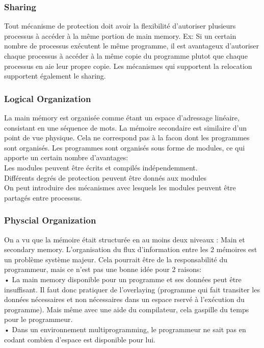 \subsubsection{Sharing}
Tout mécanisme de protection doit avoir la flexibilité d'autoriser plusieurs processus à accéder à la même portion de main memory.
Ex: Si un certain nombre de processus exécutent le même programme, il est avantageux d'autoriser chaque processus à accéder à la même copie du programme plutot que chaque processus en aie leur propre copie.
Les mécanismes qui supportent la relocation supportent également le sharing.
\subsubsection{Logical Organization}
La main mémory est organisée comme étant un espace d'adressage linéaire, consistant en une séquence de mots.
La mémoire secondaire est similaire d'un point de vue physique.
Cela ne correspond pas à la facon dont les programmes sont organisés.
Les programmes sont organisés sous forme de modules, ce qui apporte un certain nombre d'avantages: \\
Les modules peuvent être écrits et compilés indépendemment.
 \\
Différents degrés de protection peuvent être donnés aux modules \\
On peut introduire des mécanismes avec lesquels les modules peuvent être partagés entre processus.
\subsubsection{Physcial Organization}
On a vu que la mémoire était structurée en au moins deux niveaux : Main et secondary memory.
L'organisation du flux d'information entre les 2 mémoires est un problème système majeur.
Cela pourrait être de la responsabilité du programmeur, mais ce n'est pas une bonne idée pour 2 raisons: \\
• La main memory disponible pour un programme et ses données peut être insuffisant.
Il faut donc pratiquer de l'overlaying (programme qui fait transiter les données nécessaires et non nécessaires dans un espace rservé à l'exécution du programme).
Mais même avec une aide du compilateur, cela gaspille du temps pour le programmeur.
\\
• Dans un environnement multiprogramming, le programmeur ne sait pas en codant combien d'espace est disponible pour lui.
